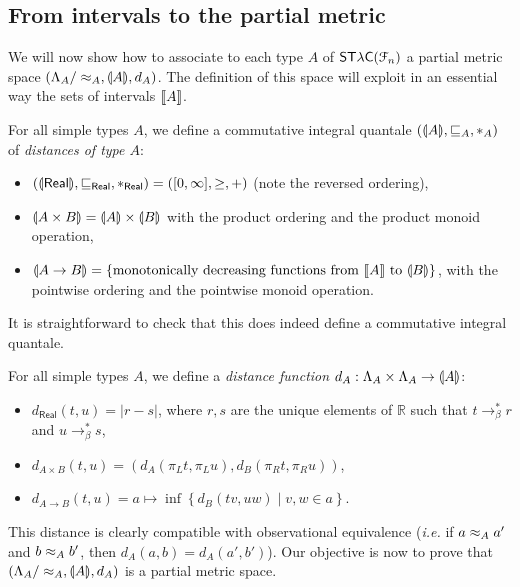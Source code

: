 \subsection{From intervals to the partial metric}

We will now show how to associate to each type $A$ of $\mathsf{ST\lambda C}(\mathcal F_{n})$ a partial metric space $(\Lambda_{A}/\approx_{A}, \llparenthesis A \rrparenthesis, d_{A})$. The definition of this space will exploit in an essential way the sets of intervals $\llbracket A \rrbracket$.


For all simple types $A$, we define a commutative integral quantale $(\llparenthesis A \rrparenthesis, \sqsubseteq_A, \mathbin{\ast}_A)$ of \emph{distances of type $A$}:
\begin{itemize}
\item $(\llparenthesis \mathsf{Real} \rrparenthesis, \sqsubseteq_\mathsf{Real}, \mathbin{\ast}_\mathsf{Real}) = ([0,\infty], \geq, +)$ (note the reversed ordering),
\item $\llparenthesis A \times B \rrparenthesis = \llparenthesis A \rrparenthesis \times \llparenthesis B \rrparenthesis$ with the product ordering and the product monoid operation,
\item $\llparenthesis A \to B \rrparenthesis = \{ \text{monotonically decreasing functions from } \llbracket A \rrbracket \text{ to } \llparenthesis B \rrparenthesis \}$, with the pointwise ordering and the pointwise monoid operation.
\end{itemize}
It is straightforward to check that this does indeed define a commutative integral quantale.

For all simple types $A$, we define a \emph{distance function} $d_A : \Lambda_A \times \Lambda_A \to \llparenthesis A \rrparenthesis$:
\begin{itemize}
\item $d_\mathsf{Real}(t,u) = \left\vert r-s \right\vert$, where $r,s$ are the unique elements of $\mathbb{R}$ such that $t \to_\beta^* r$ and $u \to_\beta^* s$,
\item $d_{A \times B}(t,u) = (d_A(\pi_L t, \pi_L u), d_B(\pi_R t, \pi_R u))$,
\item $d_{A \to B}(t,u) = a \mapsto \inf \left\{ d_B(tv, uw) \mid v,w \in a \right\}$.
\end{itemize}

This distance is clearly compatible with observational equivalence (\textit{i.e.} if $a \approx_A a'$ and $b \approx_A b'$, then $d_A(a,b) = d_A(a',b')$). Our objective is now to prove that $\left(\Lambda_A/\approx_A, \llparenthesis A \rrparenthesis, d_A\right)$ is a partial metric space.


